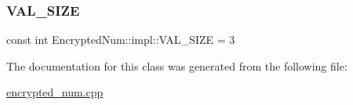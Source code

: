 \mbox{\label{class_encrypted_num_1_1impl_a6e664a6fc52249259aac82d66303985b}} 
\subsubsection{\texorpdfstring{V\+A\+L\+\_\+\+S\+I\+ZE}{VAL\_SIZE}}
{\footnotesize\ttfamily const int Encrypted\+Num\+::impl\+::\+V\+A\+L\+\_\+\+S\+I\+ZE = 3\hspace{0.3cm}{\ttfamily [static]}}



The documentation for this class was generated from the following file\+:\begin{DoxyCompactItemize}
\item 
\mbox{\hyperlink{encrypted__num_8cpp}{encrypted\+\_\+num.\+cpp}}\end{DoxyCompactItemize}
